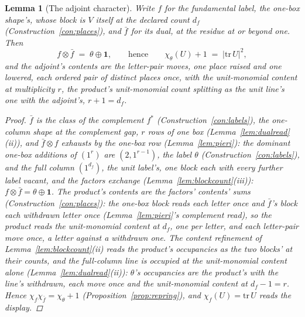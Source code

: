 \documentclass[11pt]{article}
\newtheorem{lemma}{Lemma}
\theoremstyle{definition}
\begin{document}
\begin{lemma}[The adjoint character]\label{lem:adjchar}
Write $f$ for the fundamental label, the one-box shape's, whose block
is $V$ itself at the declared count $d_f$
(Construction~\ref{con:places}), and $\bar f$ for its
dual, at the residue at or beyond one. Then
\[
f\otimes\bar f\;=\;\theta\oplus\mathbf 1 ,
\qquad\text{hence}\qquad
\chi_\theta(U)+1\;=\;|\mathrm{tr}\,U|^2 ,
\]
and the adjoint's
contents are the \emph{letter-pair moves}, one place raised
and one lowered, each ordered pair of distinct places once, with the
unit-monomial content at
multiplicity $r$, the
product's unit-monomial count splitting as the unit line's one with
the adjoint's, $r+1=d_f$.
\begin{proof}
$\bar f$ is the class of the complement $f^*$
(Construction~\ref{con:labels}), the one-column shape at the
complement gap, $r$ rows of one box (Lemma~\ref{lem:dualread}(ii)),
and $\bar f\otimes f$
exhausts by the one-box row (Lemma~\ref{lem:pieri}): the dominant
one-box additions of $(1^{r})$ are $(2,1^{r-1})$, the label
$\theta$ (Construction~\ref{con:labels}), and the full column
$(1^{d_f})$, the unit label's, one block each with every further
label vacant, and the factors exchange
(Lemma~\ref{lem:blockcount}(iii)): $f\otimes\bar f=\theta\oplus
\mathbf 1$. The product's contents are the factors' contents'
sums (Construction~\ref{con:places}): the one-box block reads each
letter once and $\bar f$'s block each withdrawn letter once
(Lemma~\ref{lem:pieri}'s complement read), so the product reads
the unit-monomial content at $d_f$, one per letter, and each
letter-pair move once, a letter against a withdrawn one. The
content refinement of Lemma~\ref{lem:blockcount}(ii) reads the
product's occupancies as the two blocks' at their counts, and the
full-column line is occupied at the unit-monomial content alone
(Lemma~\ref{lem:dualread}(ii)): $\theta$'s occupancies are the
product's with the line's withdrawn, each move once and the
unit-monomial content at $d_f-1=r$. Hence
$\chi_f\chi_{\bar f}=\chi_\theta+1$ (Proposition~\ref{prop:repring}), and
$\chi_f(U)=\mathrm{tr}\,U$ reads the display.
\end{proof}
\end{lemma}
\end{document}
